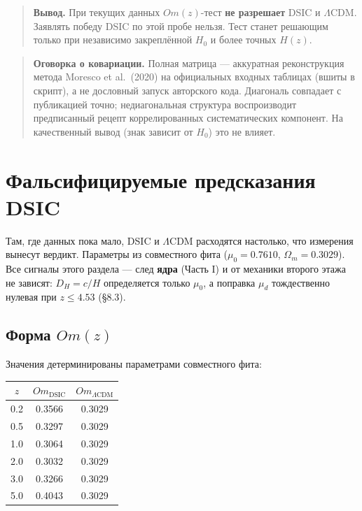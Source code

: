 \documentclass{article}
\begin{document}
\begin{quote}
\textbf{Вывод.} При текущих данных $Om(z)$-тест \textbf{не разрешает} DSIC и $\Lambda$CDM. Заявлять победу DSIC по этой пробе нельзя. Тест станет решающим только при независимо закреплённой $H_0$ и более точных $H(z)$.
\end{quote}

\begin{quote}
\textbf{Оговорка о ковариации.} Полная матрица --- аккуратная реконструкция метода Moresco et al.\ (2020) на официальных входных таблицах (вшиты в скрипт), а не дословный запуск авторского кода. Диагональ совпадает с публикацией точно; недиагональная структура воспроизводит предписанный рецепт коррелированных систематических компонент. На качественный вывод (знак зависит от $H_0$) это не влияет.
\end{quote}
\section{Фальсифицируемые предсказания DSIC}

Там, где данных пока мало, DSIC и $\Lambda$CDM расходятся настолько, что измерения вынесут вердикт. Параметры из совместного фита ($\mu_0 = 0.7610$, $\Omega_m = 0.3029$). Все сигналы этого раздела --- след \textbf{ядра} (Часть I) и от механики второго этажа не зависят: $D_H = c/H$ определяется только $\mu_0$, а поправка $\mu_d$ тождественно нулевая при $z \le 4.53$ (\S8.3).

\subsection{Форма $Om(z)$}

Значения детерминированы параметрами совместного фита:

\begin{center}
\small
\begin{tabular}{@{}ccc@{}}
\toprule
$z$ & $Om_{\text{DSIC}}$ & $Om_{\Lambda\text{CDM}}$ \\
\midrule
0.2 & 0.3566 & 0.3029 \\
0.5 & 0.3297 & 0.3029 \\
1.0 & 0.3064 & 0.3029 \\
2.0 & 0.3032 & 0.3029 \\
3.0 & 0.3266 & 0.3029 \\
5.0 & 0.4043 & 0.3029 \\
\bottomrule
\end{tabular}
\end{center}
\end{document}
